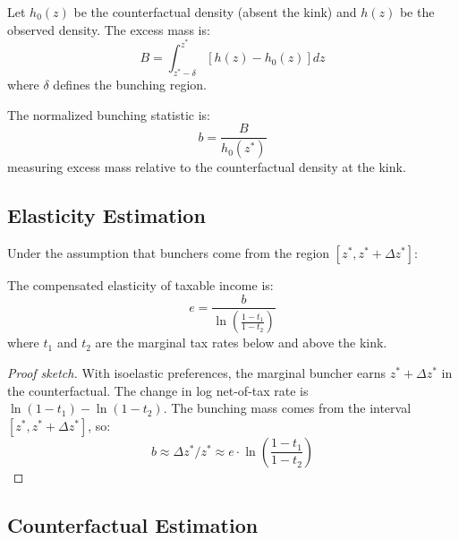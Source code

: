 \begin{definition}
\label{def:excess_mass}
Let $h_0(z)$ be the counterfactual density (absent the kink) and $h(z)$ be the observed density. The excess mass is:
\begin{equation}
    B = \int_{z^* - \delta}^{z^*} [h(z) - h_0(z)] dz
\end{equation}
where $\delta$ defines the bunching region.
\end{definition}

\begin{definition}
\label{def:normalized_bunching}
The normalized bunching statistic is:
\begin{equation}
    b = \frac{B}{h_0(z^*)}
\end{equation}
measuring excess mass relative to the counterfactual density at the kink.
\end{definition}

\subsection{Elasticity Estimation}

Under the assumption that bunchers come from the region $[z^*, z^* + \Delta z^*]$:

\begin{theorem}
\label{thm:bunching_elasticity}
The compensated elasticity of taxable income is:
\begin{equation}
    e = \frac{b}{\ln\left(\frac{1 - t_1}{1 - t_2}\right)}
    \label{eq:bunching_elasticity}
\end{equation}
where $t_1$ and $t_2$ are the marginal tax rates below and above the kink.
\end{theorem}

\begin{proof}[Proof sketch]
With isoelastic preferences, the marginal buncher earns $z^* + \Delta z^*$ in the counterfactual. The change in log net-of-tax rate is $\ln(1-t_1) - \ln(1-t_2)$. The bunching mass comes from the interval $[z^*, z^* + \Delta z^*]$, so:
\begin{equation}
    b \approx \Delta z^* / z^* \approx e \cdot \ln\left(\frac{1-t_1}{1-t_2}\right)
\end{equation}
\end{proof}

\subsection{Counterfactual Estimation}

